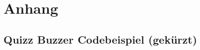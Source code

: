\appendix
\chapter{Anhang}\label{ch:A}
\section{Quizz Buzzer Codebeispiel (gekürzt)}\label{sec:code}
\newpage